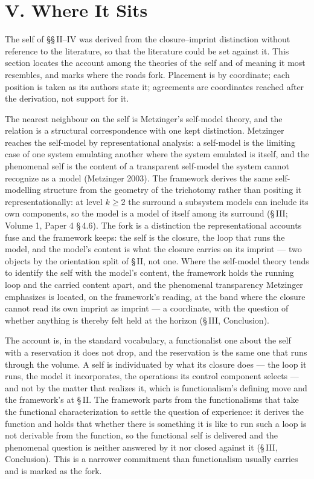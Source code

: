 \documentclass[11pt,oneside]{report}
\theoremstyle{definition}
\theoremstyle{remark}
\begin{document}
\section*{V. Where It Sits}

The self of \S\S\,II--IV was derived from the closure--imprint distinction without reference to the literature, so that the literature could be set against it. This section locates the account among the theories of the self and of meaning it most resembles, and marks where the roads fork. Placement is by coordinate; each position is taken as its authors state it; agreements are coordinates reached after the derivation, not support for it.

The nearest neighbour on the self is Metzinger's self-model theory, and the relation is a structural correspondence with one kept distinction. Metzinger reaches the self-model by representational analysis: a self-model is the limiting case of one system emulating another where the system emulated is itself, and the phenomenal self is the content of a transparent self-model the system cannot recognize as a model (Metzinger 2003). The framework derives the same self-modelling structure from the geometry of the trichotomy rather than positing it representationally: at level $k \ge 2$ the surround a subsystem models can include its own components, so the model is a model of itself among its surround (\S\,III; Volume 1, Paper 4 \S\,4.6). The fork is a distinction the representational accounts fuse and the framework keeps: the self is the closure, the loop that runs the model, and the model's content is what the closure carries on its imprint --- two objects by the orientation split of \S\,II, not one. Where the self-model theory tends to identify the self with the model's content, the framework holds the running loop and the carried content apart, and the phenomenal transparency Metzinger emphasizes is located, on the framework's reading, at the band where the closure cannot read its own imprint as imprint --- a coordinate, with the question of whether anything is thereby felt held at the horizon (\S\,III, Conclusion).

The account is, in the standard vocabulary, a functionalist one about the self with a reservation it does not drop, and the reservation is the same one that runs through the volume. A self is individuated by what its closure does --- the loop it runs, the model it incorporates, the operations its control component selects --- and not by the matter that realizes it, which is functionalism's defining move and the framework's at \S\,II. The framework parts from the functionalisms that take the functional characterization to settle the question of experience: it derives the function and holds that whether there is something it is like to run such a loop is not derivable from the function, so the functional self is delivered and the phenomenal question is neither answered by it nor closed against it (\S\,III, Conclusion). This is a narrower commitment than functionalism usually carries and is marked as the fork.
\end{document}
